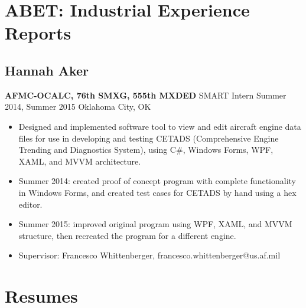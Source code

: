\section{ABET:  Industrial Experience Reports}

\subsection{Hannah Aker}

{\bf AFMC-OCALC, 76th SMXG, 555th MXDED}
SMART Intern
Summer 2014, Summer 2015
Oklahoma City, OK
\begin{itemize}
\item Designed and implemented software tool to view and edit aircraft engine data files for use in developing and testing CETADS (Comprehensive Engine Trending and Diagnostics System), using C\#, Windows Forms, WPF, XAML, and MVVM architecture. 
\item Summer 2014: created proof of concept program with complete functionality in Windows Forms, and created test cases for CETADS by hand using a hex editor. 
\item Summer 2015: improved original program using WPF, XAML, and MVVM structure, then recreated the program for a different engine.
\item Supervisor: Francesco Whittenberger, francesco.whittenberger@us.af.mil
\end{itemize}

\section{Resumes}






